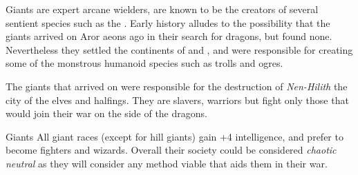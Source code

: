 Giants are expert arcane wielders, are known to be the creators of several
sentient species such as the . Early history alludes to
the possibility that the giants arrived on Aror aeons ago in their search for
dragons, but found none. Nevertheless they settled the continents of
 and , and were responsible for
creating some of the monstrous humanoid species such as trolls and ogres.

The giants that arrived on  were responsible for the
destruction of \emph{Nen-Hilith} the city of the elves and halfings. They are
slavers, warriors but fight only those that would join their war on the side
of the dragons.

\begin{35e}{Giants}
  All giant races (except for hill giants) gain +4 intelligence, and prefer to
  become fighters and wizards. Overall their society could be considered
  \emph{chaotic neutral} as they will consider any method viable that aids them
  in their war.
\end{35e}
